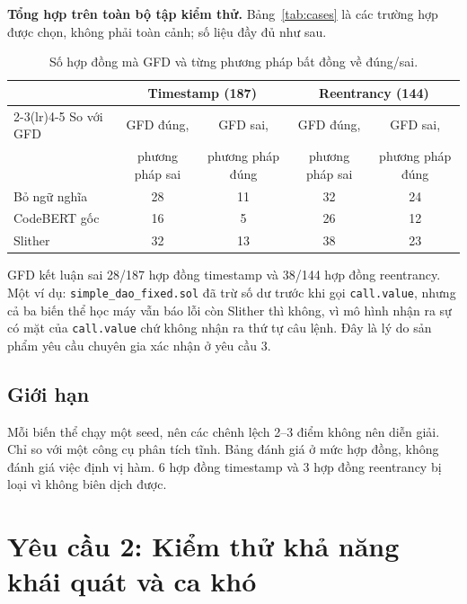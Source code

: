 \documentclass[12pt,a4paper]{article}
\newcommand{\code}[1]{\texttt{#1}}
\begin{document}
\textbf{Tổng hợp trên toàn bộ tập kiểm thử.} Bảng~\ref{tab:cases} là các trường hợp được chọn, không phải toàn cảnh; số liệu đầy đủ như sau.
\begin{table}[H]\centering\small
\caption{Số hợp đồng mà GFD và từng phương pháp bất đồng về đúng/sai.}\label{tab:disagree}
\begin{tabular}{lcccc}
\toprule
 & \multicolumn{2}{c}{Timestamp (187)} & \multicolumn{2}{c}{Reentrancy (144)}\\
\cmidrule(lr){2-3}\cmidrule(lr){4-5}
So với GFD & GFD đúng, & GFD sai, & GFD đúng, & GFD sai,\\
 & phương pháp sai & phương pháp đúng & phương pháp sai & phương pháp đúng\\
\midrule
Bỏ ngữ nghĩa & 28 & 11 & 32 & 24\\
CodeBERT gốc & 16 & 5 & 26 & 12\\
Slither & 32 & 13 & 38 & 23\\
\bottomrule
\end{tabular}
\end{table}
GFD kết luận sai 28/187 hợp đồng timestamp và 38/144 hợp đồng reentrancy. Một ví dụ: \code{simple\_dao\_fixed.sol} đã trừ số dư trước khi gọi \code{call.value}, nhưng cả ba biến thể học máy vẫn báo lỗi còn Slither thì không, vì mô hình nhận ra sự có mặt của \code{call.value} chứ không nhận ra thứ tự câu lệnh. Đây là lý do sản phẩm yêu cầu chuyên gia xác nhận ở yêu cầu 3.

\subsection{Giới hạn}
Mỗi biến thể chạy một seed, nên các chênh lệch 2--3 điểm không nên diễn giải. Chỉ so với một công cụ phân tích tĩnh. Bảng đánh giá ở mức hợp đồng, không đánh giá việc định vị hàm. 6 hợp đồng timestamp và 3 hợp đồng reentrancy bị loại vì không biên dịch được.

\section{Yêu cầu 2: Kiểm thử khả năng khái quát và ca khó}
\end{document}
